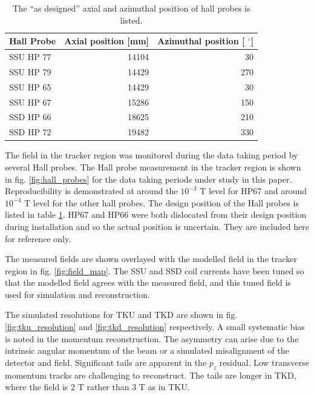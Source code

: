 \begin{table}
\caption{The ``as designed'' axial and azimuthal position of hall probes is listed.
\label{tab:hp_position}}
\centering
\begin{tabular}[pos]{l|rr}
Hall Probe & Axial position [mm] & Azimuthal position [ $^{\circ}$]\\
\hline
SSU HP 77 & 14104 & 30 \\
SSU HP 79 & 14429 & 270 \\
SSU HP 65 & 14429 & 30 \\
SSU HP 67 & 15286 & 150 \\
\hline
SSD HP 66 & 18625 & 210 \\
SSD HP 72 & 19482 & 330 \\
\end{tabular}
\end{table}

The field in the tracker region was monitored during the data taking period by
several Hall probes. The Hall probe measurement in the tracker region is shown
in fig. \ref{fig:hall_probes} for the data taking
periods under study in this paper. Reproducibility is demonstrated at around the
$10^{-3}$ T level for HP67 and around $10^{-4}$ T level for the other hall probes.
The design position of the Hall probes is listed in table \ref{tab:hp_position}. HP67 
and HP66 were both dislocated from their design position
during installation and so the actual position is uncertain. They are included 
here for reference only.

The measured fields are shown overlayed with the modelled field in the tracker 
region in fig. \ref{fig:field_map}. The SSU and SSD coil currents have been 
tuned so that the modelled field agrees with the measured field, and this tuned 
field is used for simulation and reconstruction.

The simulated resolutions for TKU and TKD are shown in fig. \ref{fig:tku_resolution}
and \ref{fig:tkd_resolution} respectively. A small systematic bias is noted in 
the momentum reconstruction. The asymmetry can arise due to the intrinsic angular momentum
of the beam or a simulated misalignment of the detector and field. 
Significant tails are apparent in the $p_z$ residual. Low transverse 
momentum tracks are challenging to reconstruct. The tails are longer
in TKD, where the field is 2 T rather than 3 T as in TKU.


